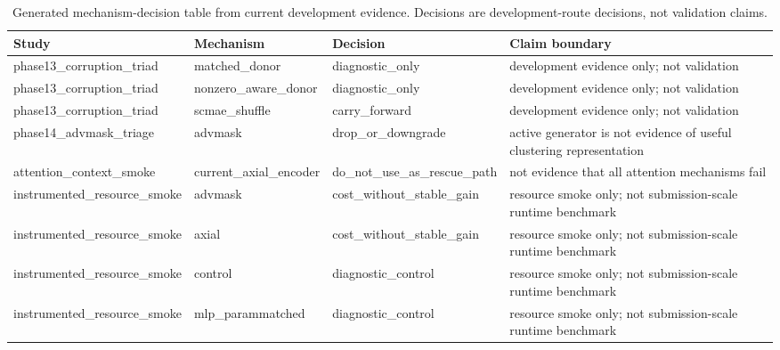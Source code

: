 \begin{table}[ht]
\centering
\caption{Generated mechanism-decision table from current development evidence. Decisions are development-route decisions, not validation claims.}
\label{tab:generated-mechanism-decisions}
\scriptsize
\begin{tabular}{llll}
\toprule
Study & Mechanism & Decision & Claim boundary \\
\midrule
phase13\_corruption\_triad & matched\_donor & diagnostic\_only & development evidence only; not validation \\
phase13\_corruption\_triad & nonzero\_aware\_donor & diagnostic\_only & development evidence only; not validation \\
phase13\_corruption\_triad & scmae\_shuffle & carry\_forward & development evidence only; not validation \\
phase14\_advmask\_triage & advmask & drop\_or\_downgrade & active generator is not evidence of useful clustering representation \\
attention\_context\_smoke & current\_axial\_encoder & do\_not\_use\_as\_rescue\_path & not evidence that all attention mechanisms fail \\
instrumented\_resource\_smoke & advmask & cost\_without\_stable\_gain & resource smoke only; not submission-scale runtime benchmark \\
instrumented\_resource\_smoke & axial & cost\_without\_stable\_gain & resource smoke only; not submission-scale runtime benchmark \\
instrumented\_resource\_smoke & control & diagnostic\_control & resource smoke only; not submission-scale runtime benchmark \\
instrumented\_resource\_smoke & mlp\_parammatched & diagnostic\_control & resource smoke only; not submission-scale runtime benchmark \\
\bottomrule
\end{tabular}
\end{table}
